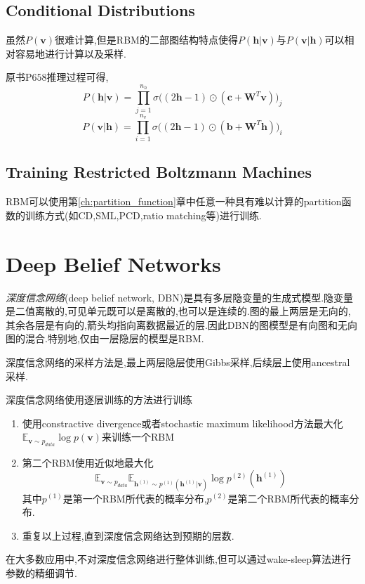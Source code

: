 \subsection{Conditional Distributions}

虽然$P(\bm v)$很难计算,但是RBM的二部图结构特点使得$P(\mathbf{h|v})$与$P(\mathbf{v|h})$可以相对容易地进行计算以及采样.

原书P$658$推理过程可得,
\begin{equation}
P(\bm{h|v})=\prod_{j=1}^{n_h}\sigma\Big((2\bm h-1)\odot(\bm c+\bm W^T\bm v)\Big)_j
\end{equation}
\begin{equation}
P(\bm{v|h})=\prod_{i=1}^{n_v}\sigma\Big((2\bm h-1)\odot(\bm b+\bm W^T\bm h)\Big)_i
\end{equation}

\subsection{Training Restricted Boltzmann Machines}

RBM可以使用第\ref{ch:partition_function}章中任意一种具有难以计算的partition函数的训练方式(如CD,SML,PCD,ratio matching等)进行训练.

\section{Deep Belief Networks}

\textit{深度信念网络}(deep belief network, DBN)是具有多层隐变量的生成式模型.隐变量是二值离散的,可见单元既可以是离散的,也可以是连续的.图的最上两层是无向的,其余各层是有向的,箭头均指向离数据最近的层.因此DBN的图模型是有向图和无向图的混合.特别地,仅由一层隐层的模型是RBM.

深度信念网络的采样方法是,最上两层隐层使用Gibbs采样,后续层上使用ancestral采样.

深度信念网络使用逐层训练的方法进行训练
\begin{enumerate}
    \item 使用constractive divergence或者stochastic maximum likelihood方法最大化$\mathbb E_{\mathbf v\sim p_{data}}\log p(\bm v)$来训练一个RBM
    \item 第二个RBM使用近似地最大化
    \begin{equation}
    \mathbb E_{\mathbf v\sim p_{data}}\mathbb E_{\mathbf h^{(1)}\sim p^{(1)}(\bm h^{(1)}|\bm v)}\log p^{(2)}(\bm h^(1))
    \end{equation}
    其中$p^{(1)}$是第一个RBM所代表的概率分布,$p^{(2)}$是第二个RBM所代表的概率分布.
    \item 重复以上过程,直到深度信念网络达到预期的层数.
\end{enumerate}
在大多数应用中,不对深度信念网络进行整体训练,但可以通过wake-sleep算法进行参数的精细调节.

